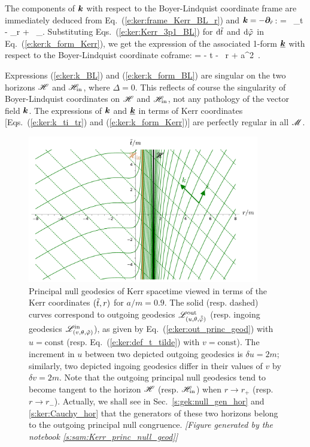 The components of $\bm{k}$ with respect to the Boyer-Lindquist coordinate frame
are immediately deduced from Eq.~(\ref{e:ker:frame_Kerr_BL_r})
and $\bm{k} = - \bm{\partial}_{\hat{r}}$:
\be \label{e:ker:k_BL}
     =  \, \wpar_t
        - \wpar_r +  \, \wpar_\ph .
\ee
Substituting Eqs.~(\ref{e:ker:Kerr_3p1_BL}) for $\mathrm{d}{\tilde t}$ and $\mathrm{d}{\tilde\varphi}$ in
Eq.~(\ref{e:ker:k_form_Kerr}), we get the expression of the associated 1-form
$\underline{\bm{k}}$ with respect to the Boyer-Lindquist coordinate coframe:
\be \label{e:ker:k_form_BL}
     = - \dd t - \, \dd r + a\sin^2\th \, \dd \ph .
\ee
\begin{remark}
Expressions (\ref{e:ker:k_BL}) and (\ref{e:ker:k_form_BL}) are singular
on the two horizons $\mathscr{H}$ and $\mathscr{H}_{\rm in}$, where $\Delta = 0$.
This reflects of course the
singularity of Boyer-Lindquist coordinates on $\mathscr{H}$ and $\mathscr{H}_{\rm in}$, not any
pathology of the vector field $\bm{k}$. The expressions of $\bm{k}$ and
$\underline{\bm{k}}$ in terms of Kerr coordinates [Eqs.~(\ref{e:ker:k_ti_tr})
and (\ref{e:ker:k_form_Kerr})] are perfectly regular in all $\mathscr{M}$.
\end{remark}


\begin{figure}
\centerline{\includegraphics[width=0.9\textwidth]{ker_princ_null_geod_a90.pdf}}
\caption[]{\label{f:ker:princ_null_geod_a90} \footnotesize
Principal null geodesics of Kerr spacetime viewed in terms of the Kerr
coordinates $({\tilde t},r)$ for $a/m=0.9$. The solid (resp. dashed) curves
correspond to outgoing geodesics $\mathscr{L}^{\rm out}_{(u,\theta,\tilde{{\tilde\varphi}})}$
(resp. ingoing geodesics $\mathscr{L}^{\rm in}_{(v,\theta,{\tilde\varphi})}$), as given by
Eq.~(\ref{e:ker:out_princ_geod}) with $u=\mathrm{const}$
(resp. Eq.~(\ref{e:ker:def_t_tilde}) with $v=\mathrm{const}$). The increment
in $u$ between two depicted outgoing geodesics is $\delta u = 2m$;
similarly, two depicted ingoing geodesics differ in their values of
$v$ by $\delta v = 2m$. Note that the outgoing principal null geodesics
tend to become tangent to the horizon $\mathscr{H}$ (resp. $\mathscr{H}_{\rm in}$) when
$r\to r_+$ (resp. $r\to r_-$). Actually, we shall see in
Sec.~\ref{s:gek:null_gen_hor} and \ref{s:ker:Cauchy_hor}
that the generators of these two horizons belong to the outgoing principal null
congruence.
\textsl{[Figure generated by the notebook \ref{s:sam:Kerr_princ_null_geod}]}
}
\end{figure}

